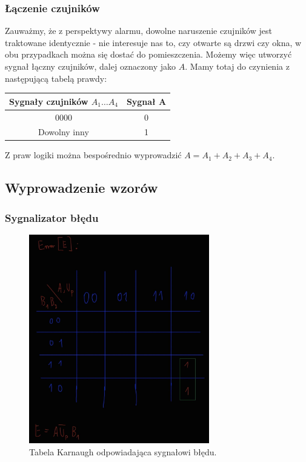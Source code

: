 \documentclass{article}
\begin{document}
\subsubsection{Łączenie czujników}
Zauważmy, że z perspektywy alarmu, dowolne naruszenie czujników jest traktowane identycznie - nie interesuje nas to, czy otwarte są drzwi czy okna, w obu przypadkach można się dostać do pomieszczenia. Możemy więc utworzyć sygnał łączny czujników, dalej oznaczony jako $A$.
Mamy totaj do czynienia z następującą tabelą prawdy: \\
\begin{center}
\begin{tabular}{c c}
Sygnały czujników $A_{1} \dots A_{4}$ & Sygnał A \\
\hline
0000 & 0 \\
Dowolny inny & 1
\end{tabular}
\end{center}
Z praw logiki można bespośrednio wyprowadzić $A = A_{1} + A_{2} + A_{3} + A_{4}$.
\subsection{Wyprowadzenie wzorów}
\subsubsection{Sygnalizator błędu}
\begin{figure}[H]
\includegraphics[width=0.7\textwidth]{Kerror}
\caption{Tabela Karnaugh odpowiadająca sygnałowi błędu.}
\end{figure}
\end{document}
